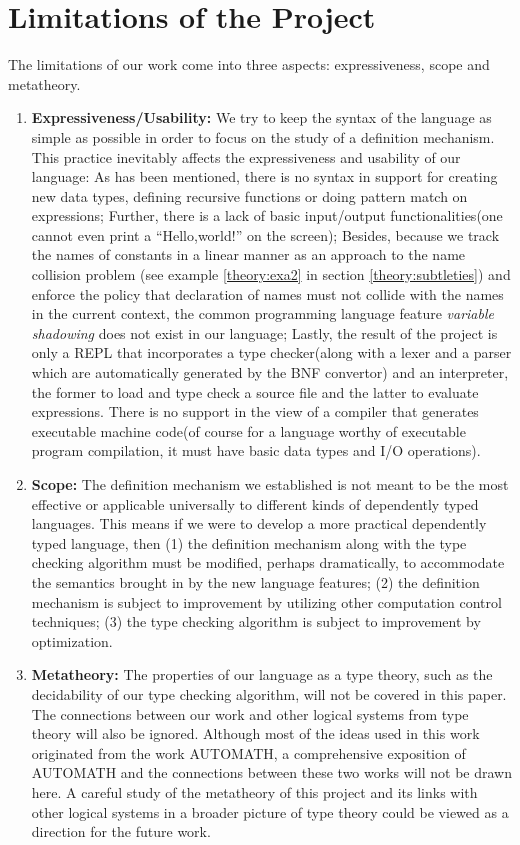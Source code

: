 \section{Limitations of the Project}
The limitations of our work come into three aspects: expressiveness, scope and metatheory.
\begin{enumerate}
\item \textbf{Expressiveness/Usability:} We try to keep the syntax of the language as simple as possible in order to focus on the study of a definition mechanism. This practice inevitably affects the expressiveness and usability of our language: As has been mentioned, there is no syntax in support for creating new data types, defining recursive functions or doing pattern match on expressions; Further, there is a lack of basic input/output functionalities(one cannot even print a ``Hello,world!'' on the screen); Besides, because we track the names of constants in a linear manner as an approach to the name collision problem (see example \ref{theory:exa2} in section \ref{theory:subtleties}) and enforce the policy that declaration of names must not collide with the names in the current context, the common programming language feature \emph{variable shadowing} does not exist in our language; Lastly, the result of the project is only a REPL that incorporates a type checker(along with a lexer and a parser which are automatically generated by the BNF convertor) and an interpreter, the former to load and type check a source file and the latter to evaluate expressions. There is no support in the view of a compiler that generates executable machine code(of course for a language worthy of executable program compilation, it must have basic data types and I/O operations).
\item \textbf{Scope:} The definition mechanism we established is not meant to be the most effective or applicable universally to different kinds of dependently typed languages. This means if we were to develop a more practical dependently typed language, then (1) the definition mechanism along with the type checking algorithm must be modified, perhaps dramatically, to accommodate the semantics brought in by the new language features; (2) the definition mechanism is subject to improvement by utilizing other computation control techniques; (3) the type checking algorithm is subject to improvement by optimization.
\item \textbf{Metatheory:} The properties of our language as a type theory, such as the decidability of our type checking algorithm, will not be covered in this paper. The connections between our work and other logical systems from type theory will also be ignored. Although most of the ideas used in this work originated from the work AUTOMATH, a comprehensive exposition of AUTOMATH and the connections between these two works will not be drawn here. A careful study of the metatheory of this project and its links with other logical systems in a broader picture of type theory could be viewed as a direction for the future work.
\end{enumerate}
